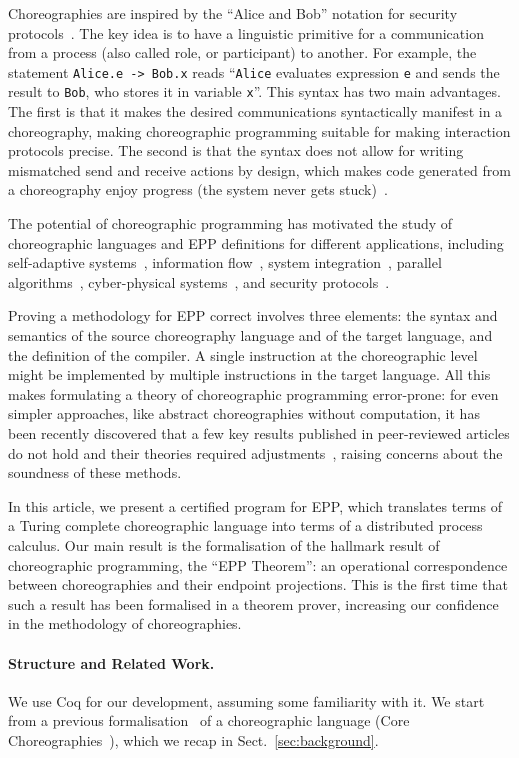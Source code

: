 \documentclass[runningheads]{llncs}
\begin{document}
Choreographies are inspired by the ``Alice and Bob'' notation for security protocols~\cite{NS78}. The key idea is to have a linguistic primitive for a communication from a process (also called role, or participant) to another. For example, the statement \lstinline+Alice.e -> Bob.x+ reads ``\lstinline+Alice+ evaluates expression \lstinline+e+ and sends the result to \lstinline+Bob+, who stores it in variable \lstinline+x+''.
This syntax has two main advantages. The first is that it makes the desired communications syntactically manifest in a choreography, making choreographic programming suitable for making interaction protocols precise.
The second is that the syntax does not allow for writing mismatched send and receive actions by design, which makes code generated from a choreography enjoy progress (the system never gets stuck)~\cite{CM13}.

The potential of choreographic programming has motivated the study of choreographic languages and EPP definitions for different applications, including self-adaptive systems~\cite{DGGLM17}, information flow~\cite{LN15}, system integration~\cite{GLR18}, parallel algorithms~\cite{CM16}, cyber-physical systems~\cite{GMP20,LH17,LNN16}, and security protocols~\cite{GMP20}.

Proving a methodology for EPP correct involves three elements: the syntax and semantics of the source choreography language and of the target language, and the definition of the compiler. A single instruction at the choreographic level might be implemented by multiple instructions in the target language. All this makes formulating a theory of choreographic programming error-prone: for even simpler approaches, like abstract choreographies without computation, it has been recently discovered that a few key results published in peer-reviewed articles do not hold and their theories required adjustments~\cite{SY19}, raising concerns about the soundness of these methods.

In this article, we present a certified program for EPP, which translates terms of a Turing complete choreographic language into terms of a distributed process calculus. Our main result is the formalisation of the hallmark result of choreographic programming, the ``EPP Theorem'': an operational correspondence between choreographies and their endpoint projections.
This is the first time that such a result has been formalised in a theorem prover, increasing our confidence in the methodology of choreographies.

\paragraph{Structure and Related Work.}
We use Coq for our development, assuming some familiarity with it. We start from a previous formalisation~\cite{CMP21} of a choreographic language (Core Choreographies~\cite{CM20}), which we recap in Sect.~\ref{sec:background}.
\end{document}
